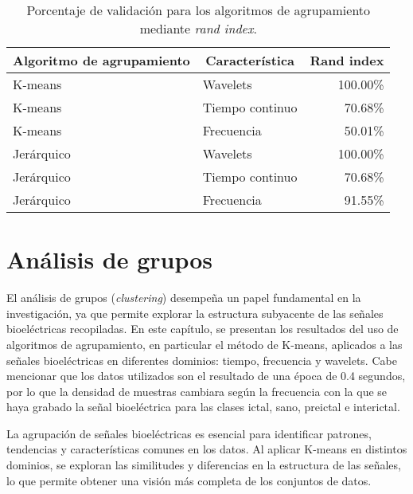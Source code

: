 \begin{table}[H]
\begin{center}
    \begin{tabular}{|l|l|r|}
    \hline
        \multicolumn{1}{|c|}{\textbf{Algoritmo de agrupamiento}} & \multicolumn{1}{c|}{\textbf{Característica}} & \multicolumn{1}{c|}{\textbf{Rand index}}\\ \hline
        K-means  & Wavelets &  100.00\% \\ \hline
        K-means  & Tiempo continuo & 70.68\% \\ \hline
        K-means  & Frecuencia & 50.01\% \\ \hline
        Jerárquico & Wavelets &  100.00\% \\ \hline
        Jerárquico & Tiempo continuo & 70.68\% \\ \hline
        Jerárquico & Frecuencia & 91.55\% \\ \hline
    \end{tabular}
    \caption[Resultado rand index para algoritmos de agrupamiento]{Porcentaje de validación para los algoritmos de agrupamiento mediante \textit{rand index}.} 
    \label{cuadro:resultado rand index}
\end{center}
\end{table}

\chapter{Análisis de grupos}
El análisis de grupos (\textit{clustering}) desempeña un papel fundamental en la investigación, ya que permite explorar la estructura subyacente de las señales bioeléctricas recopiladas. En este capítulo, se presentan los resultados del uso de algoritmos de agrupamiento, en particular el método de K-means, aplicados a las señales bioeléctricas en diferentes dominios: tiempo, frecuencia y wavelets. Cabe mencionar que los datos utilizados son el resultado de una época de 0.4 segundos, por lo que la densidad de muestras cambiara según la frecuencia con la que se haya grabado la señal bioeléctrica para las clases ictal, sano, preictal e interictal.

La agrupación de señales bioeléctricas es esencial para identificar patrones, tendencias y características comunes en los datos. Al aplicar K-means en distintos dominios, se exploran las similitudes y diferencias en la estructura de las señales, lo que permite obtener una visión más completa de los conjuntos de datos.

